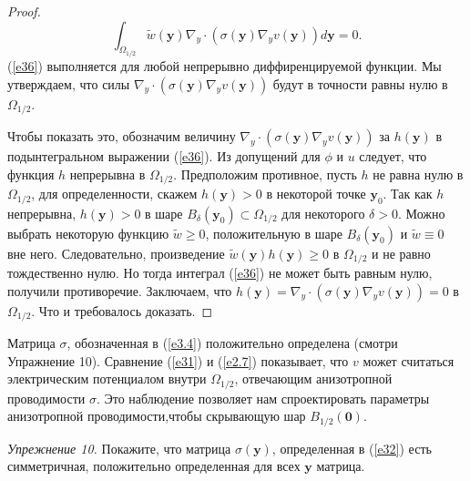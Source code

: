 \documentclass[a4paper, 12pt]{article}
\begin{document}
\begin{proof}
\begin{equation}\label{e36}
\int_{\Omega_{1/2}}{\tilde{w}(\textbf{y})\nabla_y \cdot (\sigma(\textbf{y})\nabla_y 
v(\textbf{y})) d\textbf{y}} =0.
\end{equation}
(\ref{e36}) выполняется для любой непрерывно диффиренцируемой функции. Мы утверждаем, что силы 
$\nabla_y \cdot (\sigma(\textbf{y})\nabla_y v(\textbf{y}))$ будут в точности равны нулю в $\Omega_{1/2}$.


Чтобы показать это, обозначим величину $\nabla_y \cdot (\sigma(\textbf{y})\nabla_y v(\textbf{y}))$ за
$h(\textbf{y})$ в подынтегральном выражении (\ref{e36}). Из допущений для $\phi$ и $u$ следует, 
что функция $h$ непрерывна в $\Omega_{1/2}$.
Предположим противное, пусть $h$ не равна нулю в $\Omega_{1/2}$, для определенности, скажем
$h(\textbf{y})>0$ в некоторой точке $\textbf{y}_0$. Так как $h$ непрерывна, $h(\textbf{y})>0$ в шаре
$B_{\delta}(\textbf{y}_0) \subset \Omega_{1/2}$ для некоторого $\delta > 0$.
Можно выбрать некоторую функцию $\tilde{w} \geq 0$, положительную в шаре $B_{\delta}(\textbf{y}_0)$ и 
$\tilde{w} \equiv 0$ вне него. Следовательно, произведение $\tilde{w}(\textbf{y})h(\textbf{y}) \geq 0$ в
$\Omega_{1/2}$ и не равно тождественно нулю. Но тогда интеграл (\ref{e36}) не может быть равным нулю,
получили противоречие. Заключаем, что $h(\textbf{y}) = \nabla_y \cdot (\sigma(\textbf{y})\nabla_y
v(\textbf{y})) = 0$ в $\Omega_{1/2}$. Что и требовалось доказать.
\end{proof}
Матрица $\sigma$, обозначенная в (\ref{e3.4}) положительно определена (смотри Упражнение 10).
Сравнение (\ref{e31}) и (\ref{e2.7}) показывает, что $v$ может считаться электрическим потенциалом внутри
$\Omega_{1/2}$, отвечающим анизотропной проводимости $\sigma$. Это наблюдение позволяет нам спроектировать
параметры анизотропной проводимости,чтобы скрывающую шар $B_{1/2}(\textbf{0})$.

\textit{Упрежнение 10.} Покажите, что матрица $\sigma(\textbf{y})$, определенная в (\ref{e32}) есть
симметричная, положительно определенная для всех $\textbf{y}$ матрица.   
\end{document}
